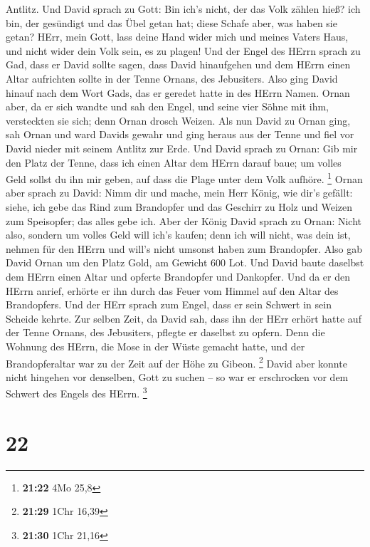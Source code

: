 Antlitz.  Und David sprach zu Gott: Bin ich's nicht, der
das Volk zählen hieß? ich bin, der gesündigt und das Übel getan hat;
diese Schafe aber, was haben sie getan? HErr, mein Gott, lass deine Hand
wider mich und meines Vaters Haus, und nicht wider dein Volk sein, es zu
plagen!  Und der Engel des HErrn sprach zu Gad, dass er
David sollte sagen, dass David hinaufgehen und dem HErrn einen Altar
aufrichten sollte in der Tenne Ornans, des Jebusiters. 
Also ging David hinauf nach dem Wort Gads, das er geredet hatte in des
HErrn Namen.  Ornan aber, da er sich wandte und sah den
Engel, und seine vier Söhne mit ihm, versteckten sie sich; denn Ornan
drosch Weizen.  Als nun David zu Ornan ging, sah Ornan
und ward Davids gewahr und ging heraus aus der Tenne und fiel vor David
nieder mit seinem Antlitz zur Erde.  Und David sprach zu
Ornan: Gib mir den Platz der Tenne, dass ich einen Altar dem HErrn
darauf baue; um volles Geld sollst du ihn mir geben, auf dass die Plage
unter dem Volk aufhöre. \footnote{\textbf{21:22} 4Mo 25,8}
 Ornan aber sprach zu David: Nimm dir und mache, mein
Herr König, wie dir's gefällt: siehe, ich gebe das Rind zum Brandopfer
und das Geschirr zu Holz und Weizen zum Speisopfer; das alles gebe ich.
 Aber der König David sprach zu Ornan: Nicht also,
sondern um volles Geld will ich's kaufen; denn ich will nicht, was dein
ist, nehmen für den HErrn und will's nicht umsonst haben zum Brandopfer.
 Also gab David Ornan um den Platz Gold, am Gewicht 600
Lot.  Und David baute daselbst dem HErrn einen Altar und
opferte Brandopfer und Dankopfer. Und da er den HErrn anrief, erhörte er
ihn durch das Feuer vom Himmel auf den Altar des Brandopfers.
 Und der HErr sprach zum Engel, dass er sein Schwert in
sein Scheide kehrte.  Zur selben Zeit, da David sah, dass
ihn der HErr erhört hatte auf der Tenne Ornans, des Jebusiters, pflegte
er daselbst zu opfern.  Denn die Wohnung des HErrn, die
Mose in der Wüste gemacht hatte, und der Brandopferaltar war zu der Zeit
auf der Höhe zu Gibeon. \footnote{\textbf{21:29} 1Chr 16,39}
 David aber konnte nicht hingehen vor denselben, Gott zu
suchen -- so war er erschrocken vor dem Schwert des Engels des HErrn.
\footnote{\textbf{21:30} 1Chr 21,16}

\hypertarget{section-21}{%
\section{22}\label{section-21}}

